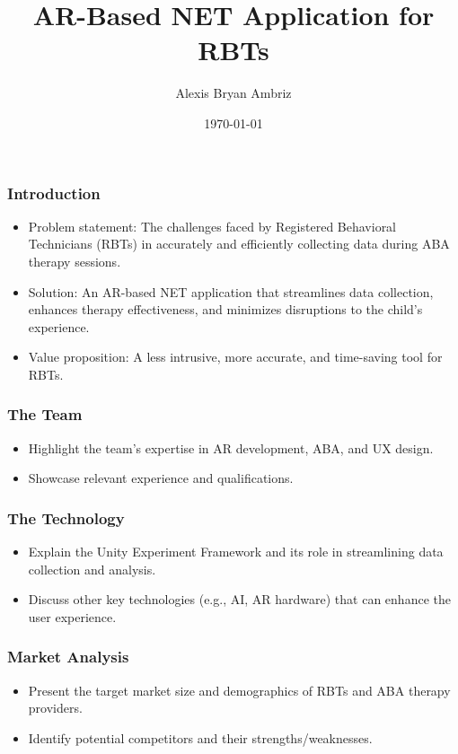 \documentclass{beamer}
\title{AR-Based NET Application for RBTs}
\author{Alexis Bryan Ambriz}
\date{\today}
\begin{document}
\begin{frame}
  \titlepage
\end{frame}

\begin{frame}
  \frametitle{Introduction}
  \begin{itemize}
    \item Problem statement: The challenges faced by Registered Behavioral Technicians (RBTs) in accurately and efficiently collecting data during ABA therapy sessions.
    \item Solution: An AR-based NET application that streamlines data collection, enhances therapy effectiveness, and minimizes disruptions to the child's experience.
    \item Value proposition: A less intrusive, more accurate, and time-saving tool for RBTs.
  \end{itemize}
\end{frame}

\begin{frame}
  \frametitle{The Team}
  \begin{itemize}
    \item Highlight the team's expertise in AR development, ABA, and UX design.
    \item Showcase relevant experience and qualifications.
  \end{itemize}
\end{frame}

\begin{frame}
  \frametitle{The Technology}
  \begin{itemize}
    \item Explain the Unity Experiment Framework and its role in streamlining data collection and analysis.
    \item Discuss other key technologies (e.g., AI, AR hardware) that can enhance the user experience.
  \end{itemize}
\end{frame}

\begin{frame}
  \frametitle{Market Analysis}
  \begin{itemize}
    \item Present the target market size and demographics of RBTs and ABA therapy providers.
    \item Identify potential competitors and their strengths/weaknesses.
  \end{itemize}
\end{frame}
\end{document}
